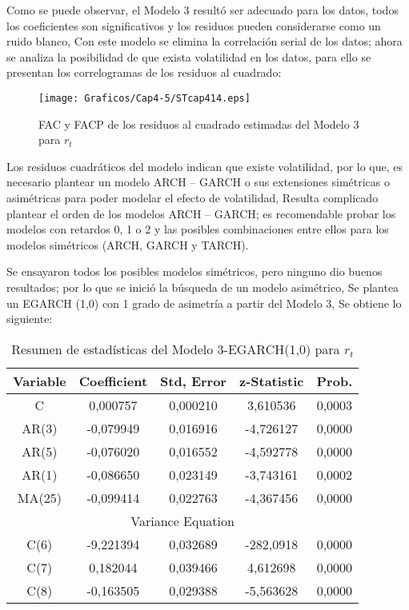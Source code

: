 Como se puede observar, el Modelo 3 result\'{o} ser adecuado para los datos, todos los coeficientes son significativos y los residuos pueden considerarse como un ruido blanco, Con este modelo se elimina la correlaci\'{o}n serial de los datos; ahora se analiza la posibilidad de que exista volatilidad en los datos, para ello se presentan los correlogramas de los residuos al cuadrado:

\begin{figure}[H]
\centering
\texttt{[image: Graficos/Cap4-5/STcap414.eps]}
\caption{FAC y FACP de los residuos al cuadrado estimadas del Modelo 3 para $r_{t}$}
\end{figure}

Los residuos cuadr\'{a}ticos del modelo indican que existe volatilidad, por lo que, es necesario plantear un modelo ARCH -- GARCH o sus extensiones sim\'{e}tricas o asim\'{e}tricas para poder modelar el efecto de volatilidad, Resulta complicado plantear el orden de los modelos ARCH -- GARCH; es recomendable probar los modelos con retardos 0, 1 o 2 y las posibles combinaciones entre ellos para los modelos sim\'{e}tricos (ARCH, GARCH y TARCH).\newline

Se ensayaron todos los posibles modelos sim\'{e}tricos, pero ninguno dio buenos resultados; por lo que se inici\'{o} la b\'{u}squeda de un modelo asim\'{e}trico, Se plantea un EGARCH (1,0) con 1 grado de asimetr\'{i}a a partir del Modelo 3, Se obtiene lo siguiente:

\begin{table}[H]
\centering
\begin{tabular}{ccccc}\hline\hline
Variable & Coefficient & Std, Error & z-Statistic & Prob.\\ \hline\hline
C & 0,000757 & 0,000210 & 3,610536 & 0,0003 \\
AR(3) & -0,079949 & 0,016916 & -4,726127 & 0,0000 \\
AR(5) & -0,076020 & 0,016552 & -4,592778 & 0,0000 \\
AR(1) & -0,086650 & 0,023149 & -3,743161 & 0,0002 \\
MA(25) & -0,099414 & 0,022763 & -4,367456 & 0,0000 \\
\multicolumn{5}{c}{Variance Equation}\\ \hline\hline
C(6) & -9,221394 & 0,032689 & -282,0918 & 0,0000 \\
C(7) & 0,182044 & 0,039466 & 4,612698 & 0,0000 \\
C(8) & -0,163505 & 0,029388 & -5,563628 & 0,0000 \\ \hline\hline
\end{tabular}
\caption{Resumen de estad\'{i}sticas del Modelo 3-EGARCH(1,0) para $r_{t}$}
\end{table}


